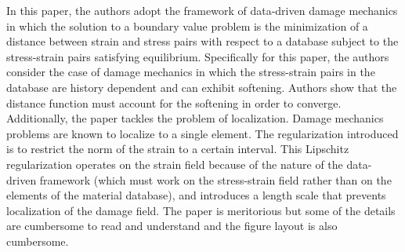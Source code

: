 \documentclass[10pt]{article}
\begin{document}
In this paper, the authors adopt the framework of data-driven damage mechanics in which the solution to a boundary value problem is the minimization of a distance between strain and stress pairs with respect to a database subject to the stress-strain pairs satisfying equilibrium. Specifically for this paper, the authors consider the case of damage mechanics in which the stress-strain pairs in the database are history dependent and can exhibit softening. Authors show that the distance function must account for the softening in order to converge. Additionally, the paper tackles the problem of localization. Damage mechanics problems are known to localize to a single element. The regularization introduced is to restrict the norm of the strain to a certain interval. This Lipschitz regularization operates on the strain field because of the nature of the data-driven framework (which must work on the stress-strain field rather than on the elements of the material database), and introduces a length scale that prevents localization of the damage field. The paper is meritorious but some of the details are cumbersome to read and understand and the figure layout is also cumbersome.
\end{document}
